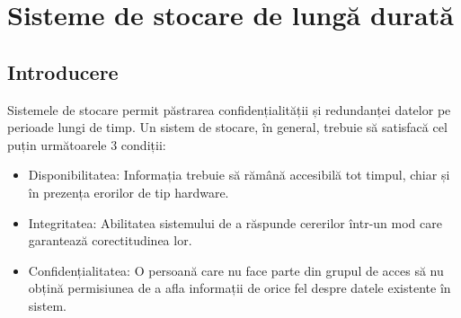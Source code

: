\documentclass[oneside, 12pt]{book}
\begin{document}



\chapter{Sisteme de stocare de lungă durată}
\label{cha:long_term}

\section{Introducere}
\label{sec:long_term_systems_intro}

Sistemele de stocare permit păstrarea confidențialității și redundanței datelor pe perioade lungi de timp. Un sistem de stocare, în general, trebuie să satisfacă cel puțin următoarele 3 condiții:
\begin{itemize}
	\item Disponibilitatea: Informația trebuie să rămână accesibilă tot timpul, chiar și în prezența erorilor de tip hardware.
	\item Integritatea: Abilitatea sistemului de a răspunde cererilor într-un mod care garantează corectitudinea lor.
	\item Confidențialitatea: O persoană care nu face parte din grupul de acces să nu obțină permisiunea de a afla informații de orice fel despre datele existente în sistem.
\end{itemize}
\end{document}
